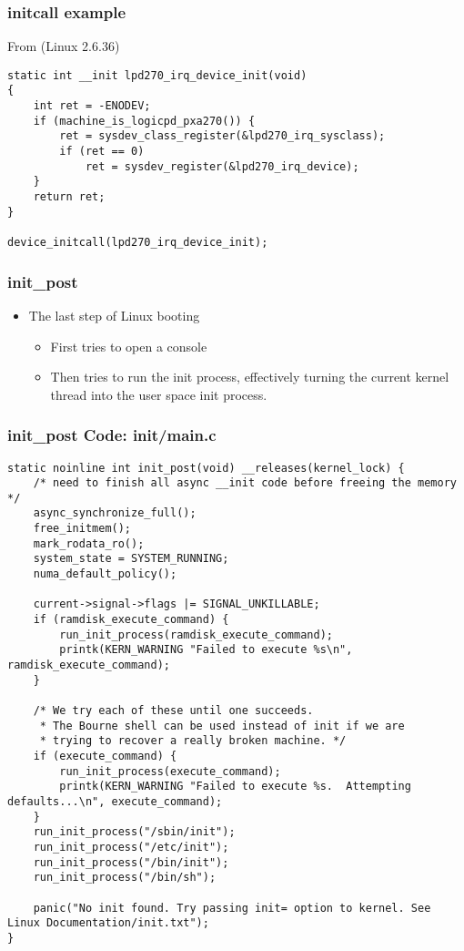 \begin{frame}[fragile]
  \frametitle{initcall example}
From  (Linux 2.6.36)
\begin{verbatim}
static int __init lpd270_irq_device_init(void)
{
    int ret = -ENODEV;
    if (machine_is_logicpd_pxa270()) {
        ret = sysdev_class_register(&lpd270_irq_sysclass);
        if (ret == 0)
            ret = sysdev_register(&lpd270_irq_device);
    }
    return ret;
}

device_initcall(lpd270_irq_device_init);
\end{verbatim}
\end{frame}

\begin{frame}
  \frametitle{init\_post}
  \begin{itemize}
  \item The last step of Linux booting
    \begin{itemize}
    \item First tries to open a console
    \item Then tries to run the init process, effectively turning the
      current kernel thread into the user space init process.
    \end{itemize}
  \end{itemize}
\end{frame}

\begin{frame}[fragile]
  \frametitle{init\_post Code: init/main.c}
\begin{verbatim}
static noinline int init_post(void) __releases(kernel_lock) {
    /* need to finish all async __init code before freeing the memory */
    async_synchronize_full();
    free_initmem();
    mark_rodata_ro();
    system_state = SYSTEM_RUNNING;
    numa_default_policy();

    current->signal->flags |= SIGNAL_UNKILLABLE;
    if (ramdisk_execute_command) {
        run_init_process(ramdisk_execute_command);
        printk(KERN_WARNING "Failed to execute %s\n", ramdisk_execute_command);
    }

    /* We try each of these until one succeeds.
     * The Bourne shell can be used instead of init if we are
     * trying to recover a really broken machine. */
    if (execute_command) {
        run_init_process(execute_command);
        printk(KERN_WARNING "Failed to execute %s.  Attempting defaults...\n", execute_command);
    }
    run_init_process("/sbin/init");
    run_init_process("/etc/init");
    run_init_process("/bin/init");
    run_init_process("/bin/sh");

    panic("No init found. Try passing init= option to kernel. See Linux Documentation/init.txt");
}
\end{verbatim}
\end{frame}

